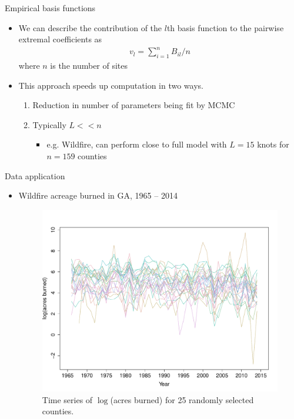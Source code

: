 \documentclass{beamer}
\begin{document}
\begin{frame}{Empirical basis functions}
  \begin{itemize} \setlength{\itemsep}{1em}
    \item We can describe the contribution of the $l$th basis function to the pairwise extremal coefficients as
    \begin{align*}
      v_l = \sum_{i = 1}^{n}B_{il} / n
    \end{align*}
    where $n$ is the number of sites
    \item This approach speeds up computation in two ways.
    \begin{enumerate}[1.] \setlength{\itemsep}{0.5em}
      \item Reduction in number of parameters being fit by MCMC
      \item Typically $L << n$
      \begin{itemize} \setlength{\itemsep}{0.25em}
        \item e.g. Wildfire, can perform close to full model with $L = 15$ knots for $n = 159$ counties
      \end{itemize}
    \end{enumerate}
  \end{itemize}
\end{frame}

\begin{frame}{Data application}
  \begin{itemize} \setlength{\itemsep}{1em}
    \item Wildfire acreage burned in GA, 1965 -- 2014
    \begin{figure}[htbp]
      \centering
      \includegraphics[width=0.60\linewidth]{plots/spag-rand-25}
      \caption{Time series of $\log$(acres burned) for 25 randomly selected counties.}
      \label{fig:firets25}
    \end{figure}
  \end{itemize}
\end{frame}
\end{document}
